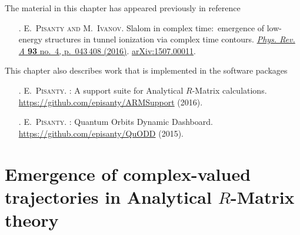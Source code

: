 The material in this chapter has appeared previously in reference
\begin{enumerate}
\item[{\hypersetup{citecolor=black}\citealp{Pisanty_slalom_2016}}.]
\textsc{E.~Pisanty and M.~Ivanov}.
\newblock Slalom in complex time:\ emergence of low-energy structures in tunnel
  ionization via complex time contours.
\newblock \href{http://dx.doi.org/10.1103/PhysRevA.93.043408}{
          \emph{Phys. Rev. A} \textbf{93} no.~4, p.~043\,408 (2016)}.
\newblock \href{http://arxiv.org/abs/1507.00011}{{arXiv}:1507.00011}.
\end{enumerate}
%
%
This chapter also describes work that is implemented in the software packages
\begin{enumerate}
\item[{\hypersetup{citecolor=black}\citealp{ARMSupport}}.]
\textsc{E.~Pisanty}.
: {A} support suite for {A}nalytical {$R$}-{M}atrix
  calculations.
\newblock \url{https://github.com/episanty/ARMSupport} (2016).


\item[{\hypersetup{citecolor=black}\citealp{QuODD}}.]
\textsc{E.~Pisanty}.
: Quantum Orbits Dynamic Dashboard.
\newblock \url{https://github.com/episanty/QuODD} (2015).
\end{enumerate}


\vfill



\section[Emergence of complex-valued trajectories in Analytical R-Matrix theory]{Emergence of complex-valued trajectories in Analytical $R$-Matrix theory}
\label{sec:emergence-of-complex-trajectories}

